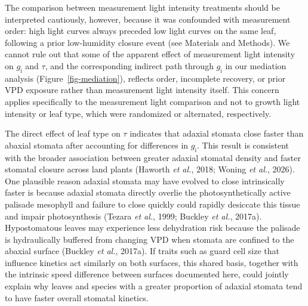 \documentclass[
  letterpaper,
  DIV=11,
  numbers=noendperiod]{scrartcl}
\newcommand{\gi}{$g_\mathrm{i}$}
\begin{document}
The comparison between measurement light intensity treatments should be
interpreted cautiously, however, because it was confounded with
measurement order: high light curves always preceded low light curves on
the same leaf, following a prior low-humidity closure event (see
Materials and Methods). We cannot rule out that some of the apparent
effect of measurement light intensity on \gi{} and \(\tau\), and the
corresponding indirect path through \gi{} in our mediation analysis
(Figure~\ref{fig-mediation}), reflects order, incomplete recovery, or
prior VPD exposure rather than measurement light intensity itself. This
concern applies specifically to the measurement light comparison and not
to growth light intensity or leaf type, which were randomized or
alternated, respectively.

The direct effect of leaf type on \(\tau\) indicates that adaxial
stomata close faster than abaxial stomata after accounting for
differences in \gi{}. This result is consistent with the broader
association between greater adaxial stomatal density and faster stomatal
closure across land plants (Haworth \emph{et al.}, 2018; Woning \emph{et
al.}, 2026). One plausible reason adaxial stomata may have evolved to
close intrinsically faster is because adaxial stomata directly overlie
the photosynthetically active palisade mesophyll and failure to close
quickly could rapidly desiccate this tissue and impair photosynthesis
(Tezara \emph{et al.}, 1999; Buckley \emph{et al.}, 2017a).
Hypostomatous leaves may experience less dehydration risk because the
palisade is hydraulically buffered from changing VPD when stomata are
confined to the abaxial surface (Buckley \emph{et al.}, 2017a). If
traits such as guard cell size that influence kinetics act similarly on
both surfaces, this shared basis, together with the intrinsic speed
difference between surfaces documented here, could jointly explain why
leaves and species with a greater proportion of adaxial stomata tend to
have faster overall stomatal kinetics.
\end{document}
